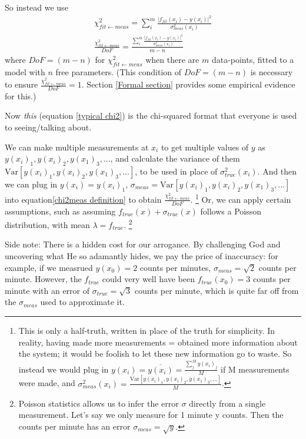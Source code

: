 \documentclass[a4paper, 12pt]{article}
\newcommand{\Var}[1]{\text{Var}[#1]}
\newcommand{\chifit}{\frac{\chi^2_{fit\leftarrow meas}}{DoF} }
\begin{document}
So instead we use 
\begin{align}
    \chi^2_{fit\leftarrow meas} = \sum_i^m \frac{|f_{fit}(x_i) - y(x_i)|^2} {\sigma_{meas}^2(x_i)} \label{typical chi2}\\
    \chifit = \frac{\sum\limits_i^m \frac{|f_{fit}(x_i) - y(x_i)|^2} {\sigma_{meas}^2(x_i)}}{m-n}
    \label{chi2meas definition}
\end{align}
where $DoF = (m-n)$ for $\chi^2_{fit\leftarrow meas}$ when there are $m$ data-points, fitted to a model with $n$ free parameters. (This condition of $DoF=(m-n)$ is necessary to ensure $\chifit=1$. Section \ref{Formal section} provides some empirical evidence for this.)

Now \textit{this} (equation \ref{typical chi2}) is the chi-squared format that everyone is used to seeing/talking about.

We can make multiple measurements at $x_i$ to get multiple values of $y$ as $y(x_i)_1, y(x_i)_2, y(x_1)_3, ...$, and calculate the variance of them $\Var{y(x_i)_1, y(x_i)_2, y(x_1)_3, ...}$, to be used in place of $\sigma_{true}^2(x_i)$. And then we can plug in $y(x_i) = y(x_i)_1$, $\sigma_{meas}=\Var{y(x_i)_1, y(x_i)_2, y(x_1)_3, ...}$ into equation\ref{chi2meas definition} to obtain $\chifit$.
\footnote{This is only a half-truth, written in place of the truth for simplicity. In reality, having made more measurements = obtained more information about the system; it would be foolish to let these new information go to waste. So instead we would plug in $y(x_i)=\overline{y(x_i)}=\frac{\sum\limits_j^M y(x_i)_j}{M}$ if M measurements were made, and $\sigma_{meas}^2(x_i)=\frac{\Var{y(x_i)_1, y(x_i)_2, y(x_1)_3, ...}}{M}$.}
Or, we can apply certain assumptions, such as assuming $f_{true}(x)+\sigma_{true}(x)$ follows a Poisson distribution, with mean $\lambda=f_{true}$.
\footnote{Poisson statistics allows us to infer the error $\sigma$ directly from a single measurement. Let's say we only measure for 1 minute y counts. Then the counts per minute has an error $\sigma_{meas}=\sqrt{y}$.}

Side note: There is a hidden cost for our arrogance. By challenging God and uncovering what He so adamantly hides, we pay the price of inaccuracy: for example, if we measrued $y(x_0) = 2$ counts per minutes, $\sigma_{meas}=\sqrt{2}$ counts per minute. However, the $f_{true}$ could very well have been $f_{true}(x_0) = 3$ counts per minute with an error of $\sigma_{true}=\sqrt{3}$ counts per minute, which is quite far off from the $\sigma_{meas}$ used to approximate it.
\end{document}
